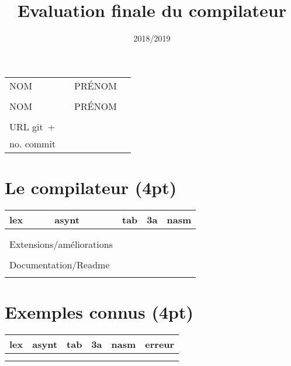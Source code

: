 \documentclass[12pt,a4paper]{article}
\title{\vspace{-1em}Evaluation finale du compilateur\vspace{-2em}}
\date{2018/2019}
\begin{document}
\setlength{\parindent}{0cm}

\maketitle

\thispagestyle{fancy}

\begin{longtable}{|l|p{5cm}|l|p{5cm}|} \hline
 NOM        & & PRÉNOM & \\ 
            & &        & \\ \hline
 NOM        & & PRÉNOM & \\ 
            & &        & \\ \hline 
 URL git~+  & \multicolumn{3}{|c|}{} \\
 no. commit & \multicolumn{3}{|c|}{} \\ \hline
\end{longtable}

\section{Le compilateur (4pt)}

\begin{longtable}{|p{2.7cm}|p{2.7cm}|p{2.7cm}|p{2.7cm}|p{2.7cm}|} \hline
lex & asynt & tab & 3a & nasm \\ \hline
& & & & \\ 
& & & & \\ \hline
\multicolumn{2}{|l|}{Extensions/améliorations} & \multicolumn{3}{c|}{} \\ 
\multicolumn{2}{|l|}{                        } & \multicolumn{3}{c|}{} \\ \hline
\multicolumn{2}{|l|}{Documentation/Readme    } & \multicolumn{3}{c|}{} \\ 
\multicolumn{2}{|l|}{                        } & \multicolumn{3}{c|}{} \\ \hline
\end{longtable}

\section{Exemples connus (4pt)}

\begin{longtable}{|p{2.2cm}|p{2.2cm}|p{2.2cm}|p{2.2cm}|p{2.2cm}|p{2.2cm}|} \hline
lex & asynt & tab & 3a & nasm & erreur\\ \hline
& & & & & \\ 
& & & & & \\ \hline
\end{longtable}
\end{document}

